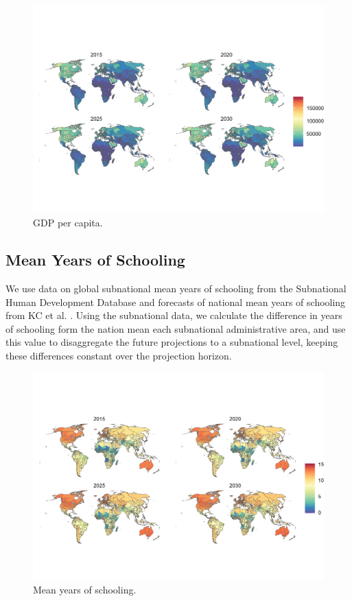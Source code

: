 \documentclass{article}
\begin{document}
\begin{figure}[H]
  \centering
  \includegraphics[width=\linewidth]{img/covars/gdp_percap.png}
  \caption{GDP per capita.}
\end{figure}

\pagebreak
\subsection{Mean Years of Schooling}
We use data on global subnational mean years of schooling from the Subnational Human Development Database \cite{Smits2019} and forecasts of national mean years of schooling from KC et al. \cite{KC2017}.  Using the subnational data, we calculate the difference in years of schooling form the nation mean each subnational administrative area, and use this value to disaggregate the future projections to a subnational level, keeping these differences constant over the projection horizon.


\begin{figure}[H]
  \centering
  \includegraphics[width=\linewidth]{img/covars/school_mean.png}
  \caption{Mean years of schooling.}
\end{figure}
\end{document}
